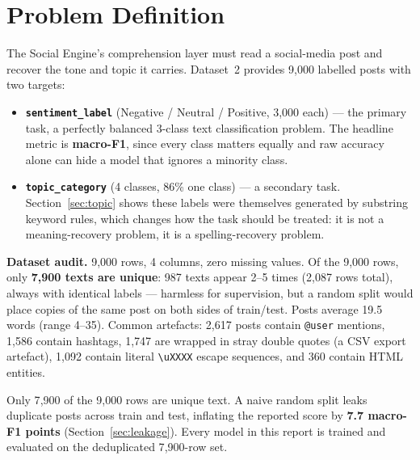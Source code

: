 \documentclass[11pt,a4paper]{article}
\begin{document}
\color{bodytext}


\tableofcontents
\newpage

\section{Problem Definition}

The Social Engine's comprehension layer must read a social-media post and recover the tone and topic it carries. Dataset~2 provides 9{,}000 labelled posts with two targets:

\begin{itemize}[leftmargin=*, itemsep=2pt]
    \item \textbf{\texttt{sentiment\_label}} (Negative / Neutral / Positive, 3{,}000 each) --- the primary task, a perfectly balanced 3-class text classification problem. The headline metric is \textbf{macro-F1}, since every class matters equally and raw accuracy alone can hide a model that ignores a minority class.
    \item \textbf{\texttt{topic\_category}} (4 classes, 86\% one class) --- a secondary task. Section~\ref{sec:topic} shows these labels were themselves generated by substring keyword rules, which changes how the task should be treated: it is not a meaning-recovery problem, it is a spelling-recovery problem.
\end{itemize}

\textbf{Dataset audit.} 9{,}000 rows, 4 columns, zero missing values. Of the 9{,}000 rows, only \textbf{7{,}900 texts are unique}: 987 texts appear 2--5 times (2{,}087 rows total), always with identical labels --- harmless for supervision, but a random split would place copies of the same post on both sides of train/test. Posts average 19.5 words (range 4--35). Common artefacts: 2{,}617 posts contain \texttt{@user} mentions, 1{,}586 contain hashtags, 1{,}747 are wrapped in stray double quotes (a CSV export artefact), 1{,}092 contain literal \texttt{\textbackslash uXXXX} escape sequences, and 360 contain HTML entities.

\begin{insightbox}
Only 7{,}900 of the 9{,}000 rows are unique text. A naive random split leaks duplicate posts across train and test, inflating the reported score by \textbf{7.7 macro-F1 points} (Section~\ref{sec:leakage}). Every model in this report is trained and evaluated on the deduplicated 7{,}900-row set.
\end{insightbox}
\end{document}

